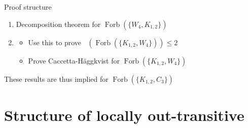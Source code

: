 \documentclass{beamer}
\newcommand{\Hag}{H\"aggkvist\xspace}
\newcommand{\ora}[1]{\overrightarrow{#1}}
\DeclareMathOperator{\dic}{\ora \chi}
\DeclareMathOperator{\Forb}{Forb}
\newcommand{\F}[1]{\Forb{#1}}
\begin{document}
\begin{frame}{Proof structure}
\begin{enumerate}
    \item Decomposition theorem for $\F{(\{W_4,K_{1,2}\})}$
    \item \begin{itemize}
            \item Use this to prove $\dic(\F{(\{K_{1,2},W_4\})}) \leq 2$
            \item Prove Caccetta-\Hag for $\F{(\{K_{1,2},W_4\})}$
          \end{itemize}
\end{enumerate}

These results are thus implied for $\F{(\{K_{1,2},C_3\})}$
\end{frame}

\section{Structure of locally out-transitive}
\end{document}
